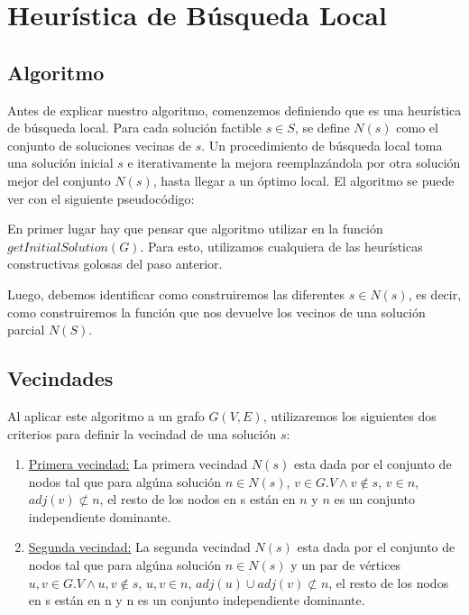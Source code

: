 \section{Heurística de Búsqueda Local}

\subsection{Algoritmo}

Antes de explicar nuestro algoritmo, comenzemos definiendo que es una heurística de búsqueda local. Para cada solución factible $s \in S$, se define $N(s)$ como el conjunto de soluciones vecinas de $s$. Un procedimiento de búsqueda local toma una solución inicial $s$ e iterativamente la mejora reemplazándola por otra solución mejor del conjunto $N(s)$, hasta llegar a un óptimo local. El algoritmo se puede ver con el siguiente pseudocódigo:

\begin{algorithmic}
		\EndIf
	\EndFor
\EndWhile
\EndProcedure
\end{algorithmic}

\hspace{1px}

En primer lugar hay que pensar que algoritmo utilizar en la función $getInitialSolution(G)$. Para esto, utilizamos cualquiera de las heurísticas constructivas golosas del paso anterior.

Luego, debemos identificar como construiremos las diferentes $s \in N(s)$, es decir, como construiremos la función que nos devuelve los vecinos de una solución parcial $N(S)$.

\subsection{Vecindades}

Al aplicar este algoritmo a un grafo $G(V,E)$, utilizaremos los siguientes dos criterios para definir la vecindad de una solución $s$:

\begin{enumerate}
\item \underline{Primera vecindad:}
La primera vecindad $N(s)$ esta dada por el conjunto de nodos tal que para algúna solución $n \in N(s)$, $v \in G.V \land v \notin s$, $v \in n$, $adj(v) \not\subset n$, el resto de los nodos en s están en $n$ y $n$ es un conjunto independiente dominante.

\item \underline{Segunda vecindad:}
La segunda vecindad $N(s)$ esta dada por el conjunto de nodos tal que para algúna solución $n \in N(s)$ y un par de vértices $u,v \in G.V \land u,v \notin s$, $u,v \in n$, $adj(u) \cup adj(v) \not\subset n$, el resto de los nodos en s están en n y n es un conjunto independiente dominante.
\end{enumerate}

